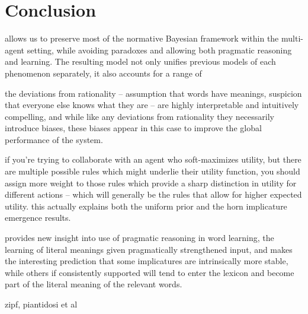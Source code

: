 \documentclass{article} %
\begin{document}



\section{Conclusion}

allows us to preserve most of the normative Bayesian framework within
the multi-agent setting, while avoiding paradoxes and allowing both
pragmatic reasoning and learning. The resulting model not only unifies
previous models of each phenomenon separately, it also accounts for a
range of

the deviations from rationality -- assumption that words have
meanings, suspicion that everyone else knows what they are -- are
highly interpretable and intuitively compelling, and while like any
deviations from rationality they necessarily introduce biases, these
biases appear in this case to improve the global performance of the
system.

if you're trying to collaborate with an agent who soft-maximizes
utility, but there are multiple possible rules which might underlie
their utility function, you should assign more weight to those rules
which provide a sharp distinction in utility for different actions --
which will generally be the rules that allow for higher expected
utility. this actually explains both the uniform prior and the horn
implicature emergence results.

provides new insight into use of pragmatic reasoning in word learning,
the learning of literal meanings given pragmatically strengthened
input, and makes the interesting prediction that some implicatures are
intrinsically more stable, while others if consistently supported will
tend to enter the lexicon and become part of the literal meaning of
the relevant words.

zipf, piantidosi et al




\newpage
\small


\end{document}
